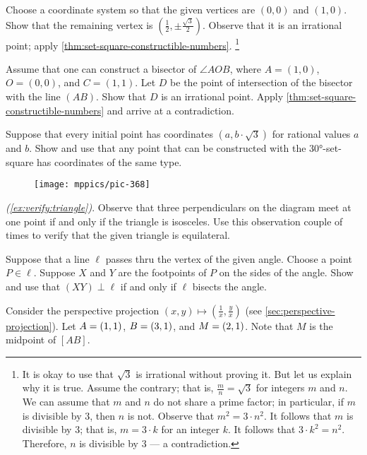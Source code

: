 \begin{multicols}{2}
Choose a coordinate system so that the given vertices are $(0,0)$ and $(1,0)$.
Show that the remaining vertex is $(\tfrac12,\pm\tfrac{\sqrt{3}}2)$.
Observe that it is an irrational point; apply \ref{thm:set-square-constructible-numbers}.%
\footnote{It is okay to use that $\sqrt{3}$ is irrational without proving it.
But let us explain why it is true. 
Assume the contrary; that is, $\tfrac mn=\sqrt{3}$ for integers $m$ and $n$.
We can assume that $m$ and $n$ do not share a prime factor; in particular, if $m$ is divisible by $3$, then $n$ is not.
Observe that $m^2=3\cdot n^2$.
It follows that $m$ is divisible by 3; that is, $m=3\cdot k$ for an integer $k$.
It follows that $3\cdot k^2=n^2$.
Therefore, $n$ is divisible by 3 --- a contradiction.} 

Assume that one can construct a bisector of $\angle AOB$, where $A=(1,0)$, $O=(0,0)$, and $C=(1,1)$.
Let $D$ be the point of intersection of the bisector with the line $(AB)$.
Show that $D$ is an irrational point.
Apply \ref{thm:set-square-constructible-numbers} and arrive at a contradiction.

Suppose that every initial point has coordinates $(a,b\cdot\sqrt{3})$ for rational values $a$ and $b$.
Show and use that any point that can be constructed with the 30°-set-square has coordinates of the same type.

{

\begin{wrapfigure}{r}{21mm}
\vskip-6mm
\centering
\texttt{[image: mppics/pic-368]}
\end{wrapfigure}

\parbf{\ref{ex:equilateral triangle-verify},} \textit{(\ref{ex:verify:triangle})}.
Observe that three perpendiculars on the diagram meet at one point if and only if the triangle is isosceles.
Use this observation couple of times to verify that the given triangle is equilateral.

Suppose that a line $\ell$ passes thru the vertex of the given angle.
Choose a point $P\in \ell$.
Suppose $X$ and $Y$ are the footpoints of $P$ on the sides of the angle.
Show and use that $(XY)\perp \ell$ if and only if $\ell$ bisects the angle.

}

Consider the perspective projection 
$(x,y)\mapsto (\tfrac 1x,\tfrac yx)$ (see \ref{sec:perspective-projection}).
Let $A\z=(1,1)$, $B\z=(3,1)$, and $M\z=(2,1)$.
Note that $M$ is the midpoint of $[AB]$.


\end{multicols}
